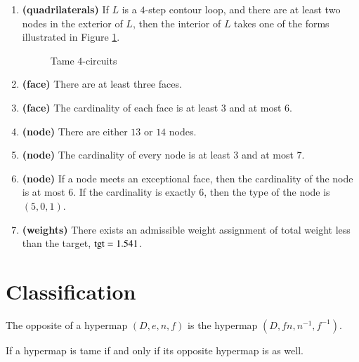 \begin{enumerate}
    \item {\bf (quadrilaterals)} If $L$ is a $4$-step contour loop, and there are at least two nodes
    in the exterior of $L$, then the interior of $L$ takes one of the forms
    illustrated in Figure
    \ref{fig:fourcircuit}.
    \label{definition:tame:4-circuit}
    \begin{figure}[htb]
        \centering
        \caption{Tame $4$-circuits}
        \label{fig:fourcircuit}
    \end{figure}
  \item {\bf (face)} There are at least three faces.
    \item {\bf (face)} The cardinality of each face is at least $3$ and at most $6$.
    \label{definition:tame:length}
    \item {\bf (node)} There are either $13$ or $14$ nodes.
    \item {\bf (node)} The cardinality of every node is at least $3$ and at most
    $7$.
    \label{definition:tame:degree}
    \item {\bf (node)} If a node meets an exceptional face,
        then the cardinality of the node is at most $6$.  If the
        cardinality is exactly $6$, then the type of the node
        is $(5,0,1)$.
    \label{definition:tame:degreeE}
    \item {\bf (weights)} There exists an admissible weight assignment
        of total weight less than the target, ${\operatorname{tgt}}=1.541$.
    \label{definition:tame:squander}
\end{enumerate}
%

\section{Classification}
    \label{sec:proof-classification}

\label{sec:classification}




\begin{definition}[opposite] The opposite of a hypermap $(D,e,n,f)$ is the
hypermap $(D,f n,n^{-1},f^{-1})$.
\end{definition}

\begin{lemma} If a hypermap is tame if and only if its opposite hypermap is as well.
\end{lemma}

